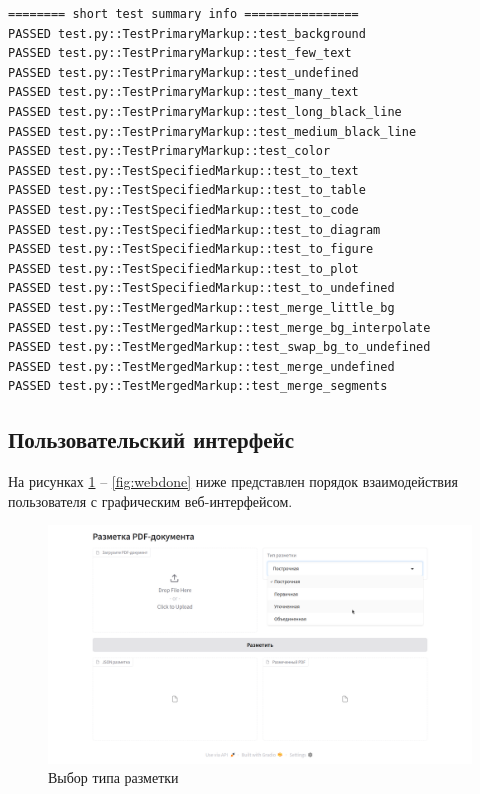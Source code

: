 \begin{lstlisting}[caption={Результаты тестирования}, label={lst:test}]
======== short test summary info ================
PASSED test.py::TestPrimaryMarkup::test_background
PASSED test.py::TestPrimaryMarkup::test_few_text
PASSED test.py::TestPrimaryMarkup::test_undefined
PASSED test.py::TestPrimaryMarkup::test_many_text
PASSED test.py::TestPrimaryMarkup::test_long_black_line
PASSED test.py::TestPrimaryMarkup::test_medium_black_line
PASSED test.py::TestPrimaryMarkup::test_color
PASSED test.py::TestSpecifiedMarkup::test_to_text
PASSED test.py::TestSpecifiedMarkup::test_to_table
PASSED test.py::TestSpecifiedMarkup::test_to_code
PASSED test.py::TestSpecifiedMarkup::test_to_diagram
PASSED test.py::TestSpecifiedMarkup::test_to_figure
PASSED test.py::TestSpecifiedMarkup::test_to_plot
PASSED test.py::TestSpecifiedMarkup::test_to_undefined
PASSED test.py::TestMergedMarkup::test_merge_little_bg
PASSED test.py::TestMergedMarkup::test_merge_bg_interpolate
PASSED test.py::TestMergedMarkup::test_swap_bg_to_undefined
PASSED test.py::TestMergedMarkup::test_merge_undefined
PASSED test.py::TestMergedMarkup::test_merge_segments
\end{lstlisting}

\subsection{Пользовательский интерфейс}


На рисунках \ref{fig:webstart} -- \ref{fig:webdone} ниже представлен порядок взаимодействия пользователя с графическим веб-интерфейсом.

\begin{figure}[H]
	\centering
	\includegraphics[width=\textwidth]{img/web-start.png}
    \caption{Выбор типа разметки}
	\label{fig:webstart}
\end{figure}

